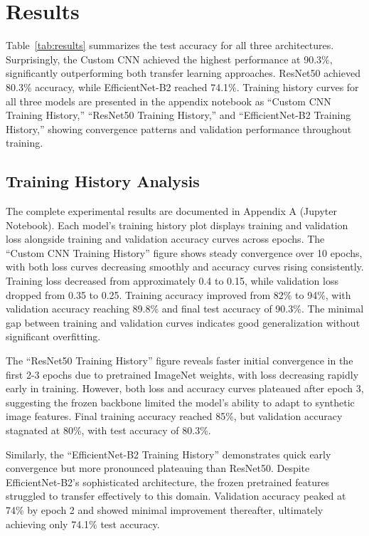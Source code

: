 \documentclass[man,12pt,letterpaper,donotrepeattitle,floatsintext]{apa7}
\begin{document}
\section{Results}
\label{results}

Table~\ref{tab:results} summarizes the test accuracy for all three architectures. 
Surprisingly, the Custom CNN achieved the highest performance at 90.3\%, significantly 
outperforming both transfer learning approaches. ResNet50 achieved 80.3\% accuracy, 
while EfficientNet-B2 reached 74.1\%. Training history curves for all three models 
are presented in the appendix notebook as ``Custom CNN Training History,'' ``ResNet50 
Training History,'' and ``EfficientNet-B2 Training History,'' showing convergence patterns 
and validation performance throughout training.

\subsection{Training History Analysis}
The complete experimental results are documented in Appendix A (Jupyter Notebook). Each 
model's training history plot displays training and validation loss alongside training and 
validation accuracy curves across epochs. The ``Custom CNN Training History'' figure shows 
steady convergence over 10 epochs, with both loss curves decreasing smoothly and accuracy 
curves rising consistently. Training loss decreased from approximately 0.4 to 0.15, while 
validation loss dropped from 0.35 to 0.25. Training accuracy improved from 82\% to 94\%, 
with validation accuracy reaching 89.8\% and final test accuracy of 90.3\%. The minimal 
gap between training and validation curves indicates good generalization without significant 
overfitting.

The ``ResNet50 Training History'' figure reveals faster initial convergence in the first 
2-3 epochs due to pretrained ImageNet weights, with loss decreasing rapidly early in training. 
However, both loss and accuracy curves plateaued after epoch 3, suggesting the frozen backbone 
limited the model's ability to adapt to synthetic image features. Final training accuracy 
reached 85\%, but validation accuracy stagnated at 80\%, with test accuracy of 80.3\%.

Similarly, the ``EfficientNet-B2 Training History'' demonstrates quick early convergence but 
more pronounced plateauing than ResNet50. Despite EfficientNet-B2's sophisticated architecture, 
the frozen pretrained features struggled to transfer effectively to this domain. Validation 
accuracy peaked at 74\% by epoch 2 and showed minimal improvement thereafter, ultimately 
achieving only 74.1\% test accuracy.
\end{document}
